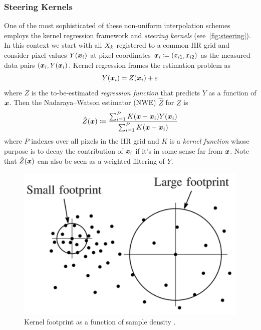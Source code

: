 \subsubsection{Steering Kernels}
One of the most sophisticated of these non-uniform interpolation schemes employs the kernel regression framework and \textit{steering kernels} (see~\ref{fig:steering}).
%
In this context we start with all \(X_k\) registered to a common HR grid and consider pixel values \(Y(\bm{x}_i)\) at pixel coordinates \(\bm{x}_i \coloneqq (x_{i1},x_{i2})\) as the measured data pairs \((\bm{x}_i, Y(\bm{x}_i)\).
%
Kernel regression frames the estimation problem as
\begin{equation}
    Y(\bm{x}_i) = Z(\bm{x}_i) + \varepsilon
\end{equation}
where \(Z\) is the to-be-estimated \textit{regression function} that predicts \(Y\) as a function of \(\bm{x}\).
Then the Nadaraya–Watson estimator (NWE) \cite{Nadaraya} \(\hat{Z}\) for \(Z\) is
\begin{equation}
    \hat{Z}(\bx) \coloneqq \frac{\sum_{i=1}^{P}K(\delx)Y(\bxi)}{\sum_{i=1}^{P}K(\delx)}
    \label{eqn:kernelregression}
\end{equation}
where \(P\) indexes over all pixels in the HR grid and \(K\) is a \textit{kernel function} whose purpose is to decay the contribution of \(\bm{x}_i\) if it's in some sense far from \(\bm{x}\).
%
Note that \(\hat{Z}(\bm{x})\) can also be seen as a weighted filtering of \(Y\).
%
\begin{figure}[!htbp]
    \centering
    \includegraphics[width=.8\linewidth]{figures/classical/footprint.png}
    \caption{Kernel footprint as a function of sample density \cite{Takeda2007}.}
    \label{fig:footprint}
\end{figure}
